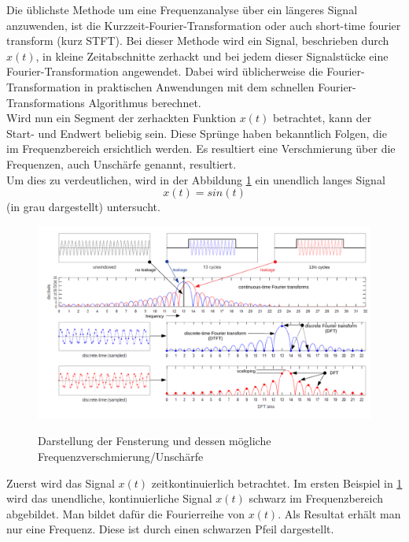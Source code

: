 
Die üblichste Methode um eine Frequenzanalyse über ein längeres Signal anzuwenden, ist die  Kurzzeit-Fourier-Transformation oder auch short-time fourier transform (kurz STFT). Bei dieser Methode wird ein Signal, beschrieben durch $x(t)$, in kleine Zeitabschnitte zerhackt und bei jedem dieser Signalstücke eine Fourier-Transformation angewendet. Dabei wird üblicherweise die Fourier-Transformation in praktischen Anwendungen mit dem schnellen Fourier-Transformations Algorithmus berechnet.\\

Wird nun ein Segment der zerhackten Funktion $x(t)$ betrachtet, kann der Start- und Endwert beliebig sein. Diese Sprünge haben bekanntlich Folgen, die im Frequenzbereich ersichtlich werden. Es resultiert eine Verschmierung über die Frequenzen, auch Unschärfe genannt, resultiert. \\

Um dies zu verdeutlichen, wird in der Abbildung \ref{fig:Spectral} ein unendlich langes Signal 
\[x(t)=sin(t)\]
(in grau dargestellt) untersucht. \\

\begin{figure}[!ht]
	\centering
	\includegraphics[scale=0.8]{papers/autotune/sections/fft/images/windows/Spectral.pdf}
	\caption{Darstellung der Fensterung und dessen mögliche Frequenzverschmierung/Unschärfe}\cite{wikipedia:Window}
	\label{fig:Spectral}
\end{figure}%

Zuerst wird das Signal $x(t)$ zeitkontinuierlich betrachtet. Im ersten Beispiel in \ref{fig:Spectral} wird das unendliche, kontinuierliche Signal $x(t)$ schwarz im Frequenzbereich abgebildet. Man bildet dafür die Fourierreihe von $x(t)$. Als Resultat erhält man nur eine Frequenz. Diese ist durch einen schwarzen Pfeil dargestellt.\\

